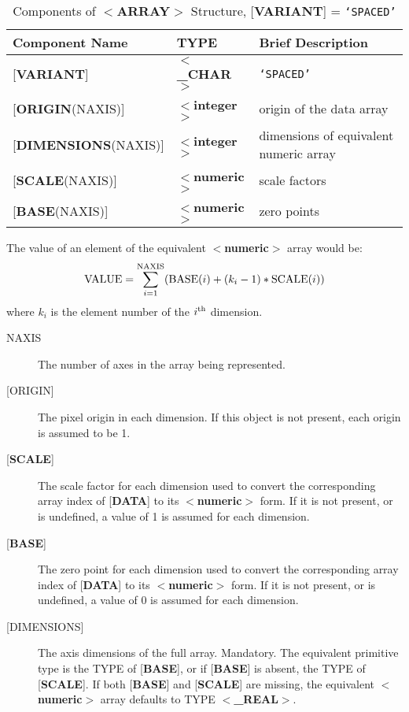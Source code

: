 \begin{table}[htb]
\centering
\caption{Components of $<${\bf ARRAY}$>$ Structure,
{[}{\bf VARIANT}{]} = {\tt `SPACED'}}
\begin{tabular}{|l|l|l|}
\hline
Component Name & TYPE & Brief Description \\  \hline
{[}{\bf VARIANT}{]} & $<${\bf \_CHAR}$>$ & {\tt `SPACED'} \\
{[}{\bf ORIGIN}(NAXIS){]} & $<${\bf integer}$>$ & origin of the data array \\
{[}{\bf DIMENSIONS}(NAXIS){]} & $<${\bf integer}$>$ & dimensions of equivalent numeric array\\
{[}{\bf SCALE}(NAXIS){]} & $<${\bf numeric}$>$ & scale factors \\
{[}{\bf BASE}(NAXIS){]} & $<${\bf numeric}$>$ & zero points \\ \hline
\end{tabular}
\end{table}

The value of an element of the equivalent
$<${\bf numeric}$>$ array would be:
\[{\rm VALUE} = \sum_{i=1}^{\rm NAXIS} ({\rm BASE}(i) + (k_i-1) * {\rm SCALE}(i) ) \]
where $k_i$ is the element number of the $i^{\rm th}$ dimension.
\begin{description}
\item [NAXIS]
The number of axes in the array being represented.
\item [{[}ORIGIN{]}]
The pixel origin in each dimension.  If this object is not present,
each origin is assumed to be 1. 
\item [{[}{\bf SCALE}{]}]
The scale factor for each dimension used to convert the corresponding
array index of {[}{\bf DATA}{]} to its
$<${\bf numeric}$>$ form.  If it is not present, or is undefined,
a value of 1 is assumed for each dimension.
\item [{[}{\bf BASE}{]}]
The zero point for each dimension used to convert the corresponding
array index of {[}{\bf DATA}{]} to its
$<${\bf numeric}$>$ form.  If it is not present, or is undefined, a value of 0
is assumed for each dimension.
\item [{[}DIMENSIONS{]}]
The axis dimensions of the full array.  Mandatory.
The equivalent primitive type
is the TYPE of {[}{\bf BASE}{]}, or if {[}{\bf BASE}{]} is
absent, the TYPE of {[}{\bf SCALE}{]}.  If both
{[}{\bf BASE}{]} and {[}{\bf SCALE}{]} are missing, the
equivalent $<${\bf numeric}$>$ array defaults to
TYPE $<${\bf \_REAL}$>$.
\end{description}


